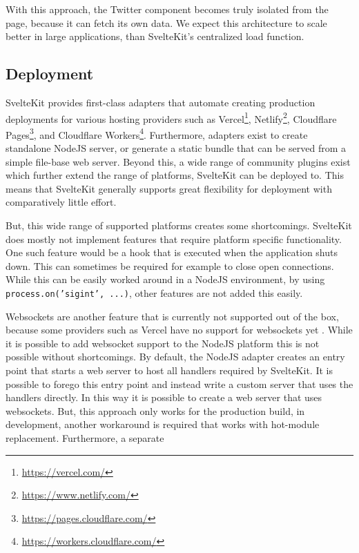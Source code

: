 With this approach, the Twitter component becomes truly isolated from the page, because it can fetch its own data. We expect this architecture to scale better in large applications, than SvelteKit's centralized load function.


\subsection{Deployment}
SvelteKit provides first-class adapters that automate creating production deployments for various hosting providers such as Vercel\footnote{\url{https://vercel.com/}}, Netlify\footnote{\url{https://www.netlify.com/}}, Cloudflare Pages\footnote{\url{https://pages.cloudflare.com/}}, and Cloudflare Workers\footnote{\url{https://workers.cloudflare.com/}}. Furthermore, adapters exist to create standalone NodeJS server, or generate a static bundle that can be served from a simple file-base web server. Beyond this, a wide range of community plugins exist which further extend the range of platforms, SvelteKit can be deployed to. This means that SvelteKit generally supports great flexibility for deployment with comparatively little effort.  

But, this wide range of supported platforms creates some shortcomings. SvelteKit does mostly not implement features that require platform specific functionality. One such feature would be a hook that is executed when the application shuts down. This can sometimes be required for example to close open connections. While this can be easily worked around in a NodeJS environment, by using \texttt{process.on('sigint', ...)}, other features are not added this easily. 

Websockets are another feature that is currently not supported out of the box, because some providers such as Vercel have no support for websockets yet \cite{noauthor_vercel_nodate}. While it is possible to add websocket support to the NodeJS platform this is not possible without shortcomings. By default, the NodeJS adapter creates an entry point that starts a web server to host all handlers required by SvelteKit. It is possible to forego this entry point and instead write a custom server that uses the handlers directly. In this way it is possible to create a web server that uses websockets. But, this approach only works for the production build, in development, another workaround is required that works with hot-module replacement. Furthermore, a separate 


